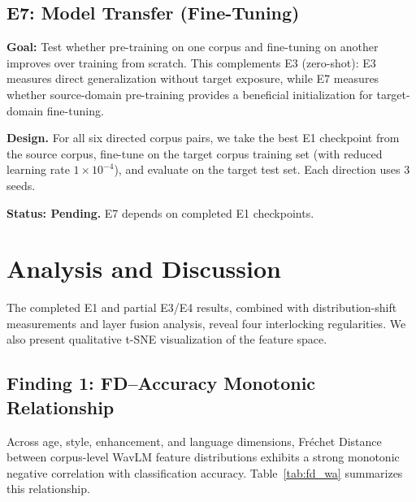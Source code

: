 \documentclass[11pt,a4paper]{article}
\begin{document}
\subsection{E7: Model Transfer (Fine-Tuning)}
\label{ssec:e7}

\textbf{Goal:} Test whether pre-training on one corpus and fine-tuning on
another improves over training from scratch. This complements E3 (zero-shot):
E3 measures direct generalization without target exposure, while E7 measures
whether source-domain pre-training provides a beneficial initialization for
target-domain fine-tuning.

\textbf{Design.} For all six directed corpus pairs, we take the best E1
checkpoint from the source corpus, fine-tune on the target corpus training set
(with reduced learning rate $1\times10^{-4}$), and evaluate on the target test
set. Each direction uses 3 seeds.

\textbf{Status: Pending.} E7 depends on completed E1 checkpoints.


\section{Analysis and Discussion}
\label{sec:analysis}

The completed E1 and partial E3/E4 results, combined with distribution-shift
measurements and layer fusion analysis, reveal four interlocking regularities.
We also present qualitative t-SNE visualization of the feature space.

\subsection{Finding 1: FD--Accuracy Monotonic Relationship}

Across age, style, enhancement, and language dimensions, Fr\'{e}chet Distance
between corpus-level WavLM feature distributions exhibits a strong monotonic
negative correlation with classification accuracy.
Table~\ref{tab:fd_wa} summarizes this relationship.
\end{document}
